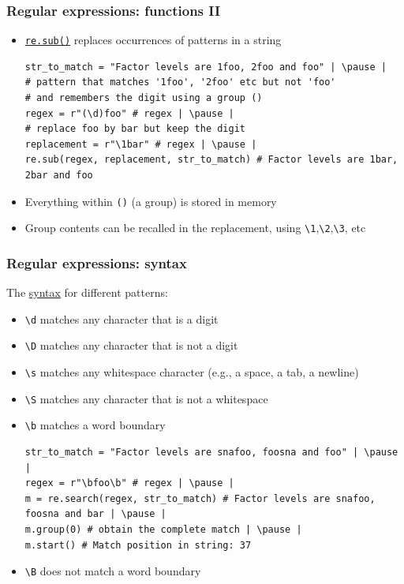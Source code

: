 \documentclass[xcolor=table]{beamer}
\begin{document}
\begin{frame}[fragile]
\frametitle{Regular expressions: functions II}
    \begin{itemize}
        \item \href{https://docs.python.org/3.7/library/re.html#re.sub}{\texttt{re.sub()}} replaces occurrences of patterns in a string \pause
\begin{lstlisting}[style=python,belowskip=-1.5 \baselineskip]
str_to_match = "Factor levels are 1foo, 2foo and foo" | \pause |
# pattern that matches '1foo', '2foo' etc but not 'foo'
# and remembers the digit using a group () 
regex = r"(\d)foo" # regex | \pause |  
# replace foo by bar but keep the digit
replacement = r"\1bar" # regex | \pause |  
re.sub(regex, replacement, str_to_match) # Factor levels are 1bar, 2bar and foo
\end{lstlisting} \pause
        \item Everything within \texttt{()} (a group) is stored in memory \pause
        \item Group contents can be recalled in the replacement, using \texttt{\textbackslash 1},\texttt{\textbackslash 2},\texttt{\textbackslash 3}, etc
    \end{itemize}
\end{frame}

\begin{frame}[fragile]
    \frametitle{Regular expressions: syntax}
    
    The \href{https://docs.python.org/3.7/library/re.html#regular-expression-syntax}{syntax} for different patterns:
    \begin{itemize}
        \item\texttt{\textbackslash d} matches any character that is a digit \pause
        \item\texttt{\textbackslash D} matches any character that is not a digit \pause
        \item\texttt{\textbackslash s} matches any whitespace character (e.g., a space, a tab, a newline) \pause
        \item\texttt{\textbackslash S} matches any character that is not a whitespace \pause
        \item\texttt{\textbackslash b} matches a word boundary \pause
\begin{lstlisting}[style=python,belowskip=-1.5 \baselineskip]
str_to_match = "Factor levels are snafoo, foosna and foo" | \pause |
regex = r"\bfoo\b" # regex | \pause |  
m = re.search(regex, str_to_match) # Factor levels are snafoo, foosna and bar | \pause |
m.group(0) # obtain the complete match | \pause |
m.start() # Match position in string: 37
\end{lstlisting} \pause
        \item\texttt{\textbackslash B} does not match a word boundary 
    \end{itemize}
\end{frame}
\end{document}
